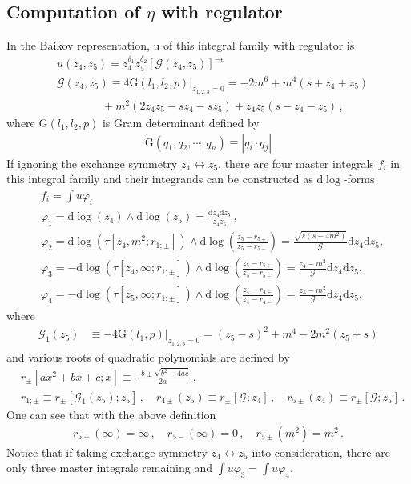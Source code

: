 \documentclass[a4paper,11pt]{article}
\newcommand{\nn}{\nonumber}
\newcommand{\nd}{\mathrm{d}}
\newcommand{\mG}{\mathcal{G}}
\newcommand{\spdot}{\!\cdot\!}
\newcommand{\nG}{\mathrm{G}}
\newcommand{\bea}{\begin{eqnarray}}
\newcommand{\eea}{\end{eqnarray}}
\begin{document}
\subsection{Computation of  $\eta$ with regulator} 

In the Baikov representation, u of this integral family with regulator is
\begin{align}
& u(z_4,z_5) = z_4^{\delta_1} z_5^{\delta_2} \left[ \mG(z_4,z_5) \right]^{-\epsilon}  \nn\\
&\mG(z_4,z_5) \equiv 4\nG(l_1,l_2,p)|_{z_{1,2,3}=0} = - 2m^6 + m^4 (s + z_4 + z_5) \nn\\
& \quad \quad \quad \quad+ m^2 (2 z_4 z_5 - s z_4 - s z_5) + z_4 z_5 (s-z_4-z_5) \,,
\end{align}
where $\nG(l_1,l_2,p)$ is Gram determinant  defined by
\begin{align}
\nG(q_1,q_2,\cdots,q_n) \equiv |q_i\spdot q_j|
\end{align}
If ignoring the exchange symmetry $z_4 \leftrightarrow z_5$, there are four master integrals $f_i$ in this integral family and their integrands can be constructed as $\nd \log$-forms
\begin{align}
& f_i = \int u \varphi_i \nn\\
	&\varphi_{1}=\nd \log(z_4)\wedge\nd \log(z_5) =\frac{\nd z_4 \nd z_5}{z_4 z_5} \,, \nn\\
	&\varphi_{2}=\nd \log(\tau[z_4,m^2;r_{1;\pm}])\wedge\nd \log\left(\frac{z_5-r_{5+}}{z_5-r_{5-}}\right) =\frac{\sqrt{s(s-4m^2)}}{\mG}\nd z_4 \nd z_5 , \nn\\
	&\varphi_{3}=-\nd \log(\tau[z_4,\infty;r_{1;\pm}])\wedge\nd \log\left(\frac{z_5-r_{5+}}{z_5-r_{5-}}\right) =\frac{ z_4-m^2 }{\mG}\nd z_4 \nd z_5, \nn\\
	&\varphi_{4}=-\nd \log(\tau[z_5,\infty;r_{1;\pm}])\wedge\nd \log\left(\frac{z_4-r_{4+}}{z_4-r_{4-}}\right)=\frac{ z_5-m^2 }{\mG}\nd z_4 \nd z_5,  \label{eq:dlog}
\end{align}
where 
\begin{align}
\mG_1(z_5) &\equiv -4\nG(l_1,p)|_{z_{1,2,3}=0} = (z_5-s)^2+m^4-2m^2(z_5+s)
\end{align}
and  various roots of quadratic polynomials are defined by
\begin{align}  
&r_{\pm}[a x^2 + b x +c;x] \equiv \frac{-b\pm\sqrt{b^2-4ac}}{2a} \, , \nn\\
  &r_{1;\pm}\equiv  r_{\pm}[\mG_1(z_5);z_5]%
  \,, \quad r_{4\pm}(z_5)\equiv r_{\pm}[\mG;z_4]\,, \quad r_{5\pm}(z_4)\equiv r_{\pm}[\mG;z_5]   \,.\label{eq:polevalue}
\end{align}
%
One can see that with the above definition 
%
\bea r_{5+}(\infty)=\infty \,, \quad r_{5-}(\infty)=0 \,, \quad r_{5\pm}(m^2)=m^2 \, . \eea
%
Notice that if taking exchange symmetry $z_4 \leftrightarrow z_5$ into consideration, there are only three master integrals remaining and $\int u\varphi_3=\int u \varphi_4$.
\end{document}
